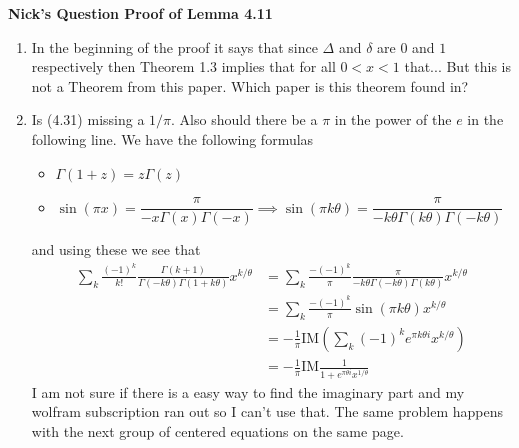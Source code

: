 \documentclass[a4paper,11pt]{article}
\numberwithin{equation}{section}
\theoremstyle{plain}
\theoremstyle{definition}
\newcounter{NQ}
\newenvironment{NickQuestion}[1][] %
{\refstepcounter{NQ}
	\begin{mdframed}[backgroundcolor=lightgray]\textbf{Nick's Question \theNQ \: #1~~}~~~\noindent}%
	{\end{mdframed}}
\numberwithin{NQ}{section}
\numberwithin{LQ}{section}
\numberwithin{ZQ}{section}
\begin{document}
\begin{NickQuestion}[Proof of Lemma 4.11]
	\begin{enumerate}
		\item In the beginning of the proof it says that since $\Delta$ and $\delta$ are $0$ and $1$ respectively then Theorem 1.3 implies that for all $0<x<1$ that... But this is not a Theorem from this paper. Which paper is this theorem found in? 
		\item Is (4.31) missing a $1/\pi$. Also should there be a $\pi$ in the power of the $e$ in the following line. We have the following formulas 
			\begin{itemize}
				\item $\Gamma(1+z)=z \Gamma(z)$
				\item $ \sin(\pi x) = \dfrac{\pi}{-x \Gamma(x) \Gamma(-x)} \implies \sin(\pi k \theta) = \dfrac{\pi}{-k \theta \Gamma(k \theta) \Gamma(-k \theta)}$
			\end{itemize}
		and using these we see that 
		\begin{align*}
		\sum_k 	\frac{(-1)^k}{k!}\frac{\Gamma(k+1)}{\Gamma(-k\theta)\Gamma(1+k\theta)} x^{k/\theta} &= \sum_k \frac{-(-1)^k}{\pi}\frac{\pi}{-k\theta\Gamma(-k\theta)\Gamma(k\theta)} x^{k/\theta}
			\\& =\sum_k \frac{-(-1)^k}{\pi}\sin(\pi k \theta) x^{k/\theta}
			\\& =-\frac{1}{\pi}\text{IM} \left(\sum_k (-1)^ke^{\pi k \theta i} x^{k/ \theta} \right)
			\\& = -\frac{1}{\pi} \text{IM} \frac{1}{1+e^{\pi \theta i}x^{1/ \theta}}
		\end{align*}
	I am not sure if there is a easy way to find the imaginary part and my wolfram subscription ran out so I can't use that. The same problem happens with the next group of centered equations on the same page.  
	\end{enumerate}
\end{NickQuestion}
\end{document}
